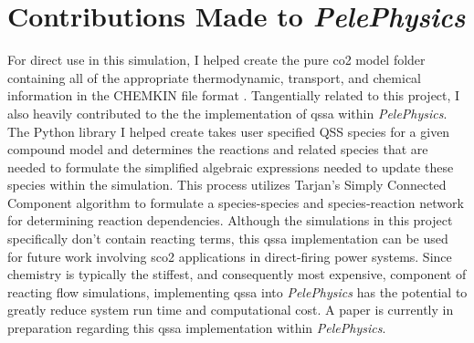 \section{Contributions Made to \textit{PelePhysics}}
For direct use in this simulation, I helped create the pure \gls{co2} model folder containing all of the appropriate thermodynamic, transport, and chemical information in the CHEMKIN file format \cite{}. Tangentially related to this project, I also heavily contributed to the the implementation of \gls{qssa} within \textit{PelePhysics}. The Python library I helped create takes user specified QSS species for a given compound model and determines the reactions and related species that are needed to formulate the simplified algebraic expressions needed to update these species within the simulation. This process utilizes Tarjan's Simply Connected Component algorithm \cite{} to formulate a species-species and species-reaction network for determining reaction dependencies. Although the simulations in this project specifically don't contain reacting terms, this \gls{qssa} implementation can be used for future work involving \gls{sco2} applications in direct-firing power systems. Since chemistry is typically the stiffest, and consequently most expensive, component of reacting flow simulations, implementing \gls{qssa} into \textit{PelePhysics} has the potential to greatly reduce system run time and computational cost. A paper is currently in preparation regarding this \gls{qssa} implementation within \textit{PelePhysics}.













